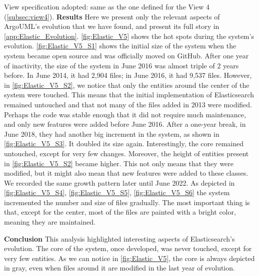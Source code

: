 View specification adopted: same as the one defined for the View 4 (\autoref{subsec:view4}).
\bigbreak
\textbf{Results}
Here we present only the relevant aspects of ArgoUML's evolution that we have found, and present its full story in \autoref{app:Elastic_Evolution}. \autoref{fig:Elastic_V5} shows the hot spots during the system's evolution. \autoref{fig:Elastic_V5_S1} shows the initial size of the system when the system became open source and was officially moved on GitHub. After one year of inactivity, the size of the system in June 2016 was almost triple of 2 years before. In June 2014, it had 2,904 files; in June 2016, it had 9,537 files. However, in \autoref{fig:Elastic_V5_S2}, we notice that only the entities around the center of the system were touched. This means that the initial implementation of Elasticsearch remained untouched and that not many of the files added in 2013 were modified. Perhaps the code was stable enough that it did not require much maintenance, and only new features were added before June 2016. After a one-year break, in June 2018, they had another big increment in the system, as shown in \autoref{fig:Elastic_V5_S3}. It doubled its size again. Interestingly, the core remained untouched, except for very few changes. Moreover, the height of entities present in \autoref{fig:Elastic_V5_S2} became higher. This not only means that they were modified, but it might also mean that new features were added to these classes. We recorded the same growth pattern later until June 2022. As depicted in \autoref{fig:Elastic_V5_S4}, \autoref{fig:Elastic_V5_S5}, \autoref{fig:Elastic_V5_S6} the system incremented the number and size of files gradually. The most important thing is that, except for the center, most of the files are painted with a bright color, meaning they are maintained. 


\bigbreak
\textbf{Conclusion} This analysis highlighted interesting aspects of Elasticsearch's evolution. The core of the system, once developed, was never touched, except for very few entities. As we can notice in  \autoref{fig:Elastic_V5}, the core is always depicted in gray, even when files around it are modified in the last year of evolution. 

